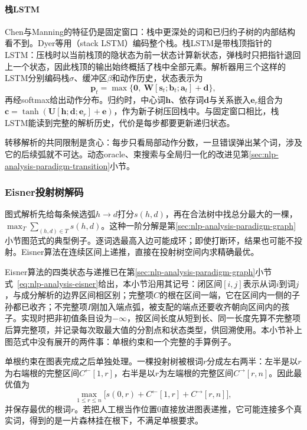 \paragraph{栈LSTM}
Chen与Manning的特征仍是固定窗口：栈中更深处的词和已归约子树的内部结构看不到。Dyer等用（stack LSTM）编码整个栈。栈LSTM是带栈顶指针的LSTM：压栈时以当前栈顶的隐状态为前一状态计算新状态，弹栈时只把指针退回上一个状态，因此栈顶的输出始终概括了栈中全部元素。解析器用三个这样的LSTM分别编码栈$\sigma$、缓冲区$\beta$和动作历史，状态表示为
\[
 \bm p_t=\max\{\bm 0,\ \bm W[\bm s_t;\bm b_t;\bm a_t]+\bm d\},
\]
再经softmax给出动作分布。归约时，中心词$\bm h$、依存词$\bm d$与关系嵌入$\bm e_r$组合为$\bm c=\tanh(\bm U[\bm h;\bm d;\bm e_r]+\bm e)$，作为新子树压回栈中。与固定窗口相比，栈LSTM能读到完整的解析历史，代价是每步都要更新递归状态。

转移解析的共同限制是贪心：每步只看局部动作分数，一旦错误弹出某个词，涉及它的后续弧就不可达。动态oracle、束搜索与全局归一化的改进见第\ref{sec:nlp-analysis-paradigm-transition}小节。

\subsubsection{Eisner投射树解码}
\label{sec:nlp-analysis-eisner}

图式解析先给每条候选弧$h\to d$打分$s(h,d)$，再在合法树中找总分最大的一棵，$\max_{T}\sum_{(h,d)\in T}s(h,d)$。这种一阶分解是第\ref{sec:nlp-analysis-paradigm-graph}小节图范式的典型例子。逐词选最高入边可能成环；即使打断环，结果也可能不投射。Eisner算法在连续区间上递推，直接在投射树空间内求精确最优。

Eisner算法的四类状态与递推已在第\ref{sec:nlp-analysis-paradigm-graph}小节式~\eqref{eq:nlp-analysis-eisner}给出，本小节沿用其记号：闭区间$[i,j]$表示从词$i$到词$j$，与成分解析的边界区间相区别；完整项$C$的根在区间一端，它在区间内一侧的子孙都已收齐；不完整项$I$刚加入端点弧，被支配的端点还要收齐朝向区间内的孩子。实现时把非初值条目设为$-\infty$，按区间长度从短到长、同一长度先算不完整项后算完整项，并记录每次取最大值的分割点和状态类型，供回溯使用。本小节补上图范式中没有展开的两件事：单根约束和一个完整的手算例子。

单根约束在图表完成之后单独处理。一棵投射树被根词$r$分成左右两半：左半是以$r$为右端根的完整区间$C^{\leftarrow}[1,r]$，右半是以$r$为左端根的完整区间$C^{\to}[r,n]$。因此最优值为
\[
 \max_{1\leq r\leq n}
 \bigl[s(0,r)+C^{\leftarrow}[1,r]+C^{\to}[r,n]\bigr],
\]
并保存最优的根词$r$。若把人工根当作位置0直接放进图表递推，它可能连接多个真实词，得到的是一片森林挂在根下，不满足单根要求。

